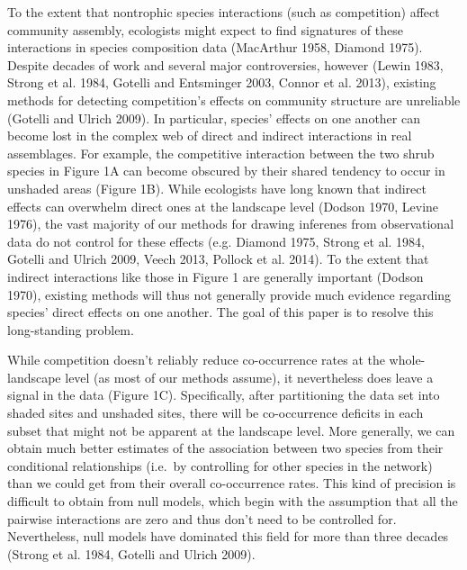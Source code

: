 \documentclass[12pt,]{article}
\begin{document}
\begin{spacing}{1.9}
\begin{flushleft}
To the extent that nontrophic species interactions (such as competition)
affect community assembly, ecologists might expect to find signatures of
these interactions in species composition data (MacArthur 1958, Diamond
1975). Despite decades of work and several major controversies, however
(Lewin 1983, Strong et al. 1984, Gotelli and Entsminger 2003, Connor et
al. 2013), existing methods for detecting competition's effects on
community structure are unreliable (Gotelli and Ulrich 2009). In
particular, species' effects on one another can become lost in the
complex web of direct and indirect interactions in real assemblages. For
example, the competitive interaction between the two shrub species in
Figure 1A can become obscured by their shared tendency to occur in
unshaded areas (Figure 1B). While ecologists have long known that
indirect effects can overwhelm direct ones at the landscape level
(Dodson 1970, Levine 1976), the vast majority of our methods for drawing
inferenes from observational data do not control for these effects (e.g.
Diamond 1975, Strong et al. 1984, Gotelli and Ulrich 2009, Veech 2013,
Pollock et al. 2014). To the extent that indirect interactions like
those in Figure 1 are generally important (Dodson 1970), existing
methods will thus not generally provide much evidence regarding species'
direct effects on one another. The goal of this paper is to resolve this
long-standing problem.

While competition doesn't reliably reduce co-occurrence rates at the
whole-landscape level (as most of our methods assume), it nevertheless
does leave a signal in the data (Figure 1C). Specifically, after
partitioning the data set into shaded sites and unshaded sites, there
will be co-occurrence deficits in each subset that might not be apparent
at the landscape level. More generally, we can obtain much better
estimates of the association between two species from their conditional
relationships (i.e.~by controlling for other species in the network)
than we could get from their overall co-occurrence rates. This kind of
precision is difficult to obtain from null models, which begin with the
assumption that all the pairwise interactions are zero and thus don't
need to be controlled for. Nevertheless, null models have dominated this
field for more than three decades (Strong et al. 1984, Gotelli and
Ulrich 2009).


\end{flushleft}
\end{spacing}
\end{document}
